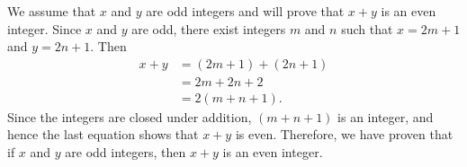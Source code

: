 \begin{list}{\bf{\ref{exer:evenoddadd}.}}
%
%
%
%
\item \begin{list}{\bf{(c)}} 
\item  We assume that $x$ and $y$ are odd integers and will prove that $x+y$ is an even integer.  Since $x$ and $y$ are odd, there exist integers $m$ and $n$ such that 
$x = 2m + 1$ and $y = 2n+1$.  Then
\begin{align*}
x + y &= \left( 2m + 1 \right) + \left( 2n + 1 \right) \\
      &= 2m + 2n + 2 \\
      &= 2 \left( m + n + 1 \right).
\end{align*}
Since the integers are closed under addition, $\left( m + n + 1 \right)$ is an integer, and hence the last equation shows that $x + y$ is even.  Therefore, we have proven that if $x$ and $y$ are odd integers, then $x+y$ is an even integer.


\end{list}
\end{list}
